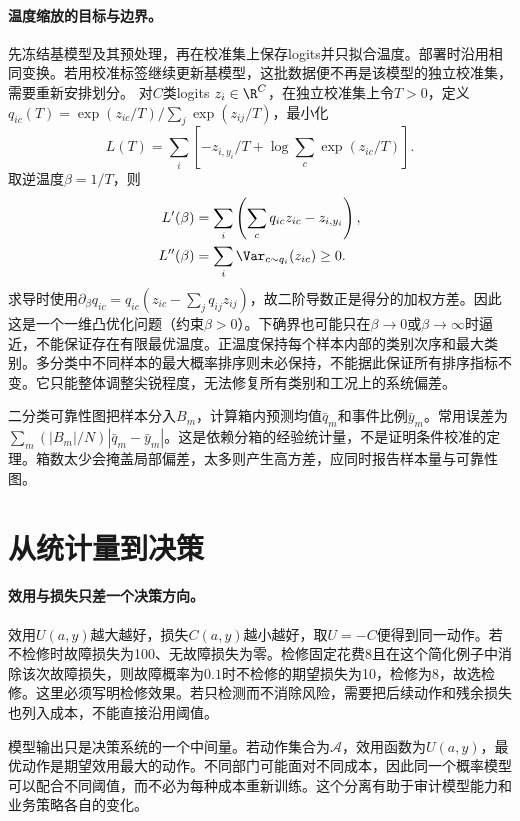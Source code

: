 \paragraph{温度缩放的目标与边界。}
先冻结基模型及其预处理，再在校准集上保存logits并只拟合温度。部署时沿用相同变换。若用校准标签继续更新基模型，这批数据便不再是该模型的独立校准集，需要重新安排划分。
对$C$类logits $z_i\in\R^C$，在独立校准集上令$T>0$，定义$q_{ic}(T)=\exp(z_{ic}/T)/\sum_j\exp(z_{ij}/T)$，最小化
\begin{equation}
 L(T)=\sum_i\left[-z_{i,y_i}/T+\log\sum_c\exp(z_{ic}/T)\right].
\end{equation}
取逆温度$\beta=1/T$，则
\begin{align}
 L'(\beta)&=\sum_i\left(\sum_cq_{ic}z_{ic}-z_{i,y_i}\right),\\
 L''(\beta)&=\sum_i\Var_{c\sim q_i}(z_{ic})\geq0.
\end{align}
求导时使用$\partial_\beta q_{ic}=q_{ic}(z_{ic}-\sum_jq_{ij}z_{ij})$，故二阶导数正是得分的加权方差。因此这是一个一维凸优化问题（约束$\beta>0$）。下确界也可能只在$\beta\to0$或$\beta\to\infty$时逼近，不能保证存在有限最优温度。正温度保持每个样本内部的类别次序和最大类别。多分类中不同样本的最大概率排序则未必保持，不能据此保证所有排序指标不变。它只能整体调整尖锐程度，无法修复所有类别和工况上的系统偏差。

二分类可靠性图把样本分入$B_m$，计算箱内预测均值$\bar q_m$和事件比例$\bar y_m$。常用误差为$\sum_m(|B_m|/N)|\bar q_m-\bar y_m|$。这是依赖分箱的经验统计量，不是证明条件校准的定理。箱数太少会掩盖局部偏差，太多则产生高方差，应同时报告样本量与可靠性图。

\section{从统计量到决策}
\paragraph{效用与损失只差一个决策方向。}
效用$U(a,y)$越大越好，损失$C(a,y)$越小越好，取$U=-C$便得到同一动作。若不检修时故障损失为100、无故障损失为零。检修固定花费8且在这个简化例子中消除该次故障损失，则故障概率为$0.1$时不检修的期望损失为10，检修为8，故选检修。这里必须写明检修效果。若只检测而不消除风险，需要把后续动作和残余损失也列入成本，不能直接沿用阈值。

模型输出只是决策系统的一个中间量。若动作集合为$\mathcal A$，效用函数为$U(a,y)$，最优动作是期望效用最大的动作。不同部门可能面对不同成本，因此同一个概率模型可以配合不同阈值，而不必为每种成本重新训练。这个分离有助于审计模型能力和业务策略各自的变化。

